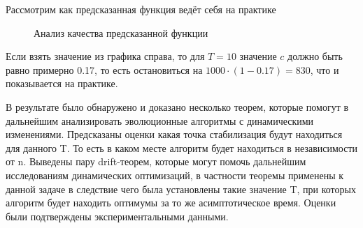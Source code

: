 \documentclass[times,specification,annotation]{itmo-student-thesis}
\begin{document}
    Рассмотрим как предсказанная функция ведёт себя на практике
    \begin{figure}[h]
        \begin{minipage}[h]{0.49\linewidth}
        \end{minipage}
        \hfill
        \begin{minipage}[h]{0.49\linewidth}
        \end{minipage}
        \caption{Анализ качества предсказанной функции}
        \label{ris:image1}
    \end{figure}

    Если взять значение из графика справа, то для $T = 10$ значение $c$ должно быть равно примерно 0.17, то есть остановиться на $1000 \cdot (1 - 0.17) = 830$, что и показывается на практике.

    \startconclusionpage
    В результате было обнаружено и доказано несколько теорем, которые помогут в дальнейшим анализировать эволюционные алгоритмы с динамическими изменениями.
    Предсказаны оценки какая точка стабилизация будут находиться для данного T. То есть в каком месте алгоритм будет находиться в независимости от n.
    Выведены пару drift-теорем, которые могут помочь дальнейшим исследованиям динамических оптимизаций, в частности теоремы применены к данной задаче в следствие чего была установлены такие значение T, при которых алгоритм будет находить оптимумы за то же асимптотическое время.
    Оценки были подтверждены экспериментальными данными.
    \printmainbibliography
\end{document}
